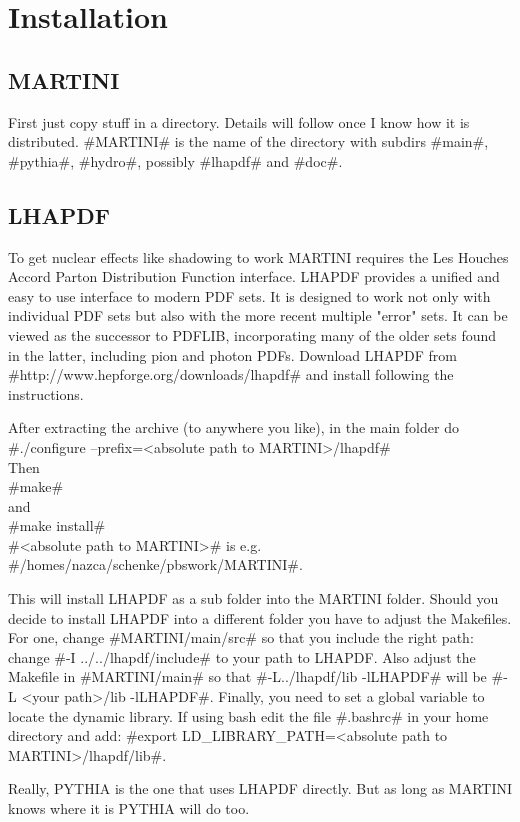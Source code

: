 \chapter{Installation}
\label{install}
\section{MARTINI}
First just copy stuff in a directory. Details will follow once I know how it is distributed.
#MARTINI# is the name of the directory with subdirs #main#, #pythia#, #hydro#, possibly #lhapdf# and #doc#. 

\section{LHAPDF}
To get nuclear effects like shadowing to work MARTINI requires the Les Houches Accord Parton Distribution Function interface.
LHAPDF provides a unified and easy to use interface to modern PDF sets. It is designed to work not only with individual PDF 
sets but also with the more recent multiple "error" sets. It can be viewed as the successor to PDFLIB, incorporating many
of the older sets found in the latter, including pion and photon PDFs. 
Download LHAPDF from #http://www.hepforge.org/downloads/lhapdf# and install following the instructions.

After extracting the archive (to anywhere you like), in the main folder do\\
#./configure --prefix=<absolute path to MARTINI>/lhapdf#\\
Then\\
#make#\\
and\\
#make install#\\
#<absolute path to MARTINI># is e.g. #/homes/nazca/schenke/pbswork/MARTINI#.

This will install LHAPDF as a sub folder into the MARTINI folder.
Should you decide to install LHAPDF into a different folder you have to adjust the Makefiles.
For one, change #MARTINI/main/src#
so that you include the right path: change #-I ../../lhapdf/include# to your path to LHAPDF.
Also adjust the Makefile in #MARTINI/main# so that #-L../lhapdf/lib -lLHAPDF# will be #-L <your path>/lib -lLHAPDF#.
Finally, you need to set a global variable to locate the dynamic library. If using bash edit the file 
#.bashrc# in your home directory and add:
#export LD_LIBRARY_PATH=<absolute path to MARTINI>/lhapdf/lib#.

Really, PYTHIA is the one that uses LHAPDF directly. But as long as MARTINI knows where it is PYTHIA will do too.

